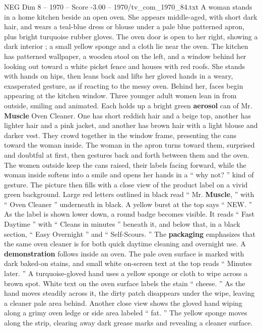 \begin{textsample}{NEG Dim 8 – 1970 – Score -3.00 – 1970/tv\_com\_1970\_84.txt}  \label{ex:f8_neg_061}
A woman stands in a home kitchen beside an open oven.
She appears middle-aged, with short dark hair, and wears a teal-blue dress or blouse under a pale blue patterned apron, plus bright turquoise rubber gloves.
The oven door is open to her right, showing a dark interior ; a small yellow sponge and a cloth lie near the oven.
The kitchen has patterned wallpaper, a wooden stool on the left, and a window behind her looking out toward a white picket fence and houses with red roofs.
She stands with hands on hips, then leans back and lifts her gloved hands in a weary, exasperated gesture, as if reacting to the messy oven.
Behind her, faces begin appearing at the kitchen window.
Three younger adult women lean in from outside, smiling and animated.
Each holds up a bright green \textbf{aerosol} can of Mr. \textbf{Muscle} Oven Cleaner.
One has short reddish hair and a beige top, another has lighter hair and a pink jacket, and another has brown hair with a light blouse and darker vest.
They crowd together in the window frame, presenting the cans toward the woman inside.
The woman in the apron turns toward them, surprised and doubtful at first, then gestures back and forth between them and the oven.
The women outside keep the cans raised, their labels facing forward, while the woman inside softens into a smile and opens her hands in a “ why not? ” kind of gesture.
The picture then fills with a close view of the product label on a vivid green background.
Large red letters outlined in black read “ Mr. \textbf{Muscle}, ” with “ Oven Cleaner ” underneath in black.
A yellow burst at the top says “ NEW. ” As the label is shown lower down, a round badge becomes visible.
It reads “ Fast Daytime ” with “ Cleans in minutes ” beneath it, and below that, in a black section, “ Easy Overnight ” and “ Self-Scours. ” The \textbf{packaging} emphasizes that the same oven cleaner is for both quick daytime cleaning and overnight use.
A \textbf{demonstration} follows inside an oven.
The pale oven surface is marked with dark baked-on stains, and small white on-screen text at the top reads “ Minutes later. ” A turquoise-gloved hand uses a yellow sponge or cloth to wipe across a brown spot.
White text on the oven surface labels the stain “ cheese. ” As the hand moves steadily across it, the dirty patch disappears under the wipe, leaving a cleaner pale area behind.
Another close view shows the gloved hand wiping along a grimy oven ledge or side area labeled “ fat. ” The yellow sponge moves along the strip, clearing away dark grease marks and revealing a cleaner surface.

\end{textsample}
